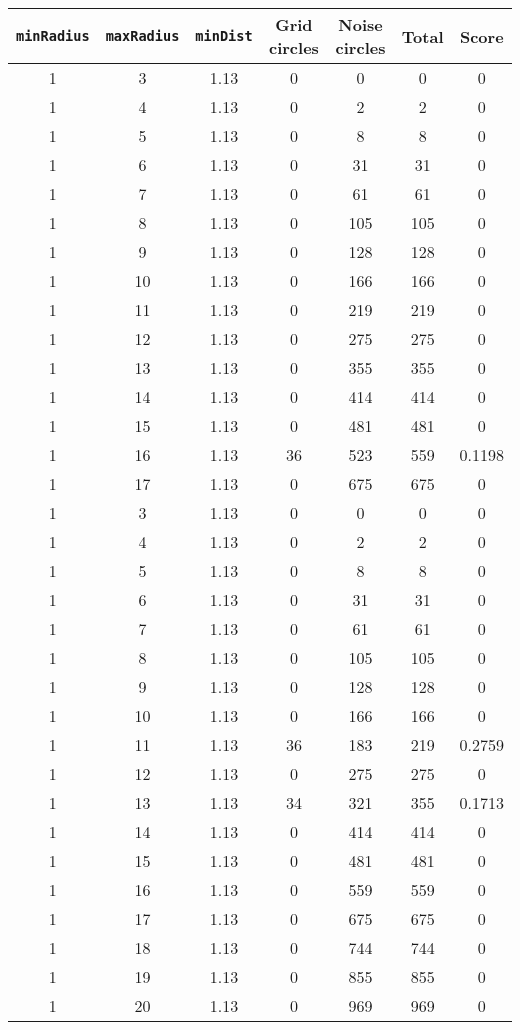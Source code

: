 \documentclass[letterpaper, 12pt]{article}
\begin{document}
\begin{longtable}{|c|c|c|c|c|c|c|}
\hline
\textbf{\texttt{minRadius}} & \textbf{\texttt{maxRadius}} & \textbf{\texttt{minDist}} & \textbf{Grid circles} & \textbf{Noise circles} & \textbf{Total} & \textbf{Score} \\
\hline
1 & 3 & 1.13 & 0 & 0 & 0 & 0 \\
\hline
1 & 4 & 1.13 & 0 & 2 & 2 & 0 \\
\hline
1 & 5 & 1.13 & 0 & 8 & 8 & 0 \\
\hline
1 & 6 & 1.13 & 0 & 31 & 31 & 0 \\
\hline
1 & 7 & 1.13 & 0 & 61 & 61 & 0 \\
\hline
1 & 8 & 1.13 & 0 & 105 & 105 & 0 \\
\hline
1 & 9 & 1.13 & 0 & 128 & 128 & 0 \\
\hline
1 & 10 & 1.13 & 0 & 166 & 166 & 0 \\
\hline
1 & 11 & 1.13 & 0 & 219 & 219 & 0 \\
\hline
1 & 12 & 1.13 & 0 & 275 & 275 & 0 \\
\hline
1 & 13 & 1.13 & 0 & 355 & 355 & 0 \\
\hline
1 & 14 & 1.13 & 0 & 414 & 414 & 0 \\
\hline
1 & 15 & 1.13 & 0 & 481 & 481 & 0 \\
\hline
1 & 16 & 1.13 & 36 & 523 & 559 & 0.1198 \\
\hline
1 & 17 & 1.13 & 0 & 675 & 675 & 0 \\
\hline
1 & 3 & 1.13 & 0 & 0 & 0 & 0 \\
\hline
1 & 4 & 1.13 & 0 & 2 & 2 & 0 \\
\hline
1 & 5 & 1.13 & 0 & 8 & 8 & 0 \\
\hline
1 & 6 & 1.13 & 0 & 31 & 31 & 0 \\
\hline
1 & 7 & 1.13 & 0 & 61 & 61 & 0 \\
\hline
1 & 8 & 1.13 & 0 & 105 & 105 & 0 \\
\hline
1 & 9 & 1.13 & 0 & 128 & 128 & 0 \\
\hline
1 & 10 & 1.13 & 0 & 166 & 166 & 0 \\
\hline
1 & 11 & 1.13 & 36 & 183 & 219 & 0.2759 \\
\hline
1 & 12 & 1.13 & 0 & 275 & 275 & 0 \\
\hline
1 & 13 & 1.13 & 34 & 321 & 355 & 0.1713 \\
\hline
1 & 14 & 1.13 & 0 & 414 & 414 & 0 \\
\hline
1 & 15 & 1.13 & 0 & 481 & 481 & 0 \\
\hline
1 & 16 & 1.13 & 0 & 559 & 559 & 0 \\
\hline
1 & 17 & 1.13 & 0 & 675 & 675 & 0 \\
\hline
1 & 18 & 1.13 & 0 & 744 & 744 & 0 \\
\hline
1 & 19 & 1.13 & 0 & 855 & 855 & 0 \\
\hline
1 & 20 & 1.13 & 0 & 969 & 969 & 0 \\
\hline
\end{longtable}
\end{document}
